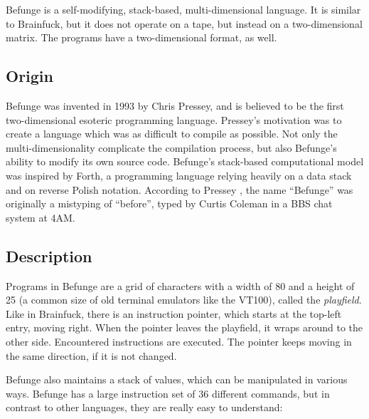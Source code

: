 Befunge is a self-modifying, stack-based, multi-dimensional language. It is similar to Brainfuck, but it does not operate on a tape, but instead on a two-dimensional matrix. The programs have a two-dimensional format, as well.

\subsection{Origin}

Befunge was invented in 1993 by Chris Pressey, and is believed to be the first two-dimensional esoteric programming language. Pressey's motivation was to create a language which was as difficult to compile as possible. Not only the multi-dimensionality complicate the compilation process, but also Befunge's ability to modify its own source code. Befunge's stack-based computational model was inspired by Forth, a programming language relying heavily on a data stack and on reverse Polish notation. According to Pressey \cite{pressey_coleman}, the name “Befunge” was originally a mistyping of “before”, typed by Curtis Coleman in a BBS chat system at 4AM.

\subsection{Description}

Programs in Befunge are a grid of \ascii{} characters with a width of 80 and a height of 25 (a common size of old terminal emulators like the VT100), called the \emph{playfield}. Like in Brainfuck, there is an instruction pointer, which starts at the top-left entry, moving right. When the pointer leaves the playfield, it wraps around to the other side. Encountered instructions are executed. The pointer keeps moving in the same direction, if it is not changed.

Befunge also maintains a stack of values, which can be manipulated in various ways. Befunge has a large instruction set of 36 different commands, but in contrast to other languages, they are really easy to understand:

